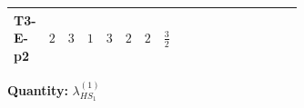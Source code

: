 \documentclass[8pt]{article}
\begin{document}
\begin{landscape}
\begin{longtable}{@{}llcccccc >{\raggedright\arraybackslash}p{0.21\linewidth} >{\raggedright\arraybackslash}p{0.21\linewidth} >{\raggedright\arraybackslash}p{0.21\linewidth}@{}}
\midrule
T3-E-p2 & $2$ & $3$ & $1$ & $3$ & $2$ & $2$ & $\frac{3}{2}$ & \scriptsize\adjustbox{max width=\linewidth}{$\begin{gathered} -\frac{33 {g_2}^2 {\lambda_{HS_1}^{(1)}}}{2}\end{gathered}$} & \scriptsize\adjustbox{max width=\linewidth}{$\begin{gathered} +3 {g_1}^4\end{gathered}$} & \scriptsize\adjustbox{max width=\linewidth}{$\begin{gathered} -\frac{15 {g_1}^2 {\lambda_{HS_1}^{(1)}}}{2}\end{gathered}$} \\
\midrule
\bottomrule
\end{longtable}
\clearpage
\noindent\textbf{Quantity: }$\lambda_{HS_1}^{(1)}$\par\smallskip

\end{landscape}
\end{document}

